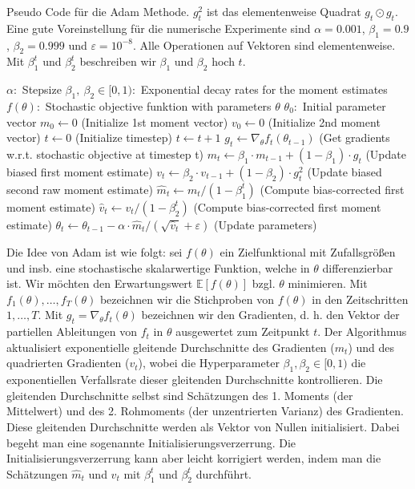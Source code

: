 \documentclass[12pt,titlepage,headsepline]{article}
\begin{document}
      \begin{algorithm}[H]\label{adam: algo}
        \caption{Pseudo Code für die Adam Methode. $g_t^2$ ist das elementenweise Quadrat $g_t \odot g_t$. Eine gute Voreinstellung für die numerische Experimente sind $\alpha = 0.001$, $\beta_1 = 0.9$, $\beta_2 = 0.999$ und $\varepsilon = 10^{-8}$. Alle Operationen auf Vektoren sind elementenweise. Mit $\beta_1^t$ und $\beta_2^t$ beschreiben wir $\beta_1$ und $\beta_2$ hoch $t$.}
        \begin{algorithmic}
          \Require $\alpha:$ Stepsize
          \Require $\beta_1, \ \beta_2 \in [0,1):$ Exponential decay rates for the moment estimates
          \Require $f(\theta):$ Stochastic objective funktion with parameters $\theta$
          \Require $\theta_0:$ Initial parameter vector
          \State $m_0 \leftarrow 0$ (Initialize 1st moment vector)
          \State $v_0 \leftarrow 0$ (Initialize 2nd moment vector)
          \State $t \leftarrow 0$ (Initialize timestep)
          \State $t \leftarrow t + 1$
          \State $g_t \leftarrow \nabla_{\theta}f_t(\theta_{t-1})$ (Get gradients w.r.t. stochastic objective at timestep t)
          \State $m_t \leftarrow \beta_1 \cdot m_{t-1} + (1-\beta_1) \cdot g_t$ (Update biased first moment estimate)
          \State $v_t \leftarrow \beta_2 \cdot v_{t-1} + (1-\beta_2) \cdot g_t^2$ (Update biased second raw moment estimate)
          \State $\hat m_t \leftarrow m_t / (1-\beta_1^t)$ (Compute bias-corrected first moment estimate)
          \State $\hat v_t \leftarrow v_t / (1-\beta_2^t)$ (Compute bias-corrected first moment estimate)
          \State $\theta_t \leftarrow \theta_{t-1} - \alpha \cdot \hat m_t / (\sqrt{\hat v_t} + \varepsilon)$ (Update parameters)
          \EndWhile
        \end{algorithmic}
      \end{algorithm}
      \hfill\break
      Die Idee von Adam ist wie folgt: sei $f(\theta)$ ein Zielfunktional mit Zufallsgrößen und insb. eine stochastische skalarwertige Funktion, welche in $\theta$ differenzierbar ist. Wir möchten den Erwartungswert $\mathbb{E}[f(\theta)]$ bzgl. $\theta$ minimieren. Mit $f_1(\theta),\ldots,f_T(\theta)$ bezeichnen wir die Stichproben von $f(\theta)$ in den Zeitschritten $1,\ldots,T$. Mit $g_t = \nabla_{\theta}f_t(\theta)$ bezeichnen wir den Gradienten, d. h. den Vektor der partiellen Ableitungen von $f_t$ in $\theta$ ausgewertet zum Zeitpunkt $t$.
      \hfill\break
      Der Algorithmus aktualisiert exponentielle gleitende Durchschnitte des Gradienten ($m_t$) und des quadrierten Gradienten ($v_t$), wobei die Hyperparameter $\beta_1,\beta_2 \in [0, 1)$ die exponentiellen Verfallsrate dieser gleitenden Durchschnitte kontrollieren. Die gleitenden Durchschnitte selbst sind Schätzungen des 1. Moments (der Mittelwert) und des 2. Rohmoments (der unzentrierten Varianz) des Gradienten. Diese gleitenden Durchschnitte werden als Vektor von Nullen initialisiert. Dabei begeht man eine sogenannte Initialisierungsverzerrung. Die Initialisierungsverzerrung kann aber leicht korrigiert werden, indem man die Schätzungen $\hat m_t$ und $\hat v_t$ mit $\beta_1^t$ und $\beta_2^t$ durchführt.
\end{document}
